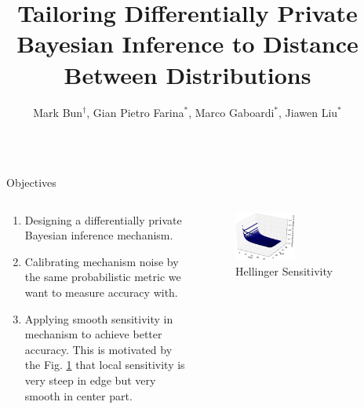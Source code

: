 \documentclass[final,hyperref={pdfpagelabels=false}]{beamer}
\title{\LARGE Tailoring Differentially Private Bayesian Inference to Distance Between Distributions} %
\author{Mark Bun$^\dag$,
Gian Pietro Farina$^{*}$,
Marco Gaboardi$^{*}$,
Jiawen Liu$^{*}$
}
\institute{$^\dag$Princeton University, $^{*}$University at Buffalo, SUNY} %
\begin{document}
\begin{frame}[t] %

\begin{columns}[t] %

\begin{column}{.015\textwidth}\end{column} %

\begin{column}{.485\textwidth} %


\begin{block}{Objectives}
\begin{columns} %
\begin{column}{.57\textwidth}
\begin{enumerate}
\item Designing a differentially private Bayesian inference mechanism.
\item Calibrating mechanism noise by the same probabilistic metric we want to measure accuracy with.
\item Applying smooth sensitivity in mechanism to achieve better accuracy. This is motivated by the Fig. \ref{fig_sensitivity} that local sensitivity is very steep in edge but very smooth in center part.
\end{enumerate}
\end{column}
\begin{column}{.42\textwidth}
\begin{figure}[ht]
\centering
\includegraphics[width=0.5\textwidth]{poster_0.eps}
\caption{Hellinger Sensitivity}
\label{fig_sensitivity}
\end{figure}
\end{column}
\end{columns}


\end{block}
\end{column}
\end{columns}
\end{frame}
\end{document}
